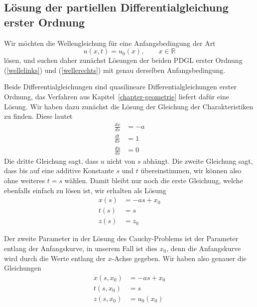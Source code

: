 \subsection{Lösung der partiellen Differentialgleichung erster Ordnung}
Wir möchten die Wellengleichung für eine Anfangsbedingung der Art
\begin{equation}
u(x,t)=u_0(x),\qquad x\in\mathbb R
\label{welleanfang}
\end{equation}
lösen, und suchen daher zunächst Lösungen der beiden
PDGL erster Ordnung (\ref{wellelinks}) und (\ref{wellerechts})
mit genau derselben Anfangsbedingung.

Beide Differentialgleichungen sind quasilineare Differentialgleichungen
erster Ordnung, das Verfahren aus Kapitel~\ref{chapter-geometrie}
liefert dafür eine Lösung. Wir haben dazu zunächst die Lösung der
Gleichung der Charakteristiken zu finden. Diese lautet
\begin{align*}
\frac{dx}{ds}&=-a
\\
\frac{dt}{ds}&=1
\\
\frac{du}{ds}&=0
\end{align*}
Die dritte Gleichung sagt, dass $u$ nicht von $s$ abhängt. Die
zweite Gleichung sagt, dass bis auf eine additive Konstante $s$
und $t$ übereinstimmen, wir können also ohne weiteres $t=s$
wählen. Damit bleibt nur noch die erste Gleichung, welche ebenfalls
einfach zu lösen ist, wir erhalten als Lösung
\begin{equation}
\begin{aligned}
x(s)&=-as+x_0\\
t(s)&=s\\
z(s)&=z_0
\end{aligned}
\label{hyperbolisch:quasi1}
\end{equation}

Der zweite Parameter in der Lösung des Cauchy-Problems ist der
Parameter entlang der Anfangskurve, in unserem Fall ist dies $x_0$,
denn die Anfangskurve wird durch die Werte entlang der $x$-Achse
gegeben. Wir haben also genauer die Gleichungen
\begin{equation}
\begin{aligned}
x(s,x_0)&=-as+x_0\\
t(s,x_0)&=s\\
z(s,x_0)&=u_0(x_0)
\end{aligned}
\label{hyperbolisch:quasi2}
\end{equation}

